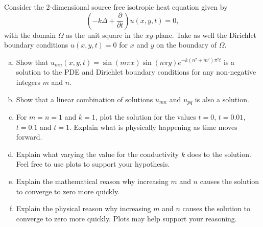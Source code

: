 \documentclass[12pt]{article} %
\begin{document}
\begin{problem}
    Consider the 2-dimensional source free isotropic heat equation given by
    \[
    \left( -k \Delta + \frac{\partial}{\partial t} \right) u(x,y,t) = 0,
    \]
    with the domain $\Omega$ as the unit square in the $xy$-plane. Take as well the Dirichlet boundary conditions $u(x,y,t)=0$ for $x$ and $y$ on the boundary of $\Omega$.
    \begin{enumerate}[(a)]
        \item Show that $u_{mn}(x,y,t)=\sin(m\pi x)\sin(n\pi y)e^{-k(n^2+m^2)\pi^2 t}$ is a solution to the PDE and Dirichlet boundary conditions for any non-negative integers $m$ and $n$.
        \item Show that a linear combination of solutions $u_{mn}$ and $u_{pq}$ is also a solution.
        \item For $m=n=1$ and $k=1$, plot the solution for the values $t=0$, $t=0.01$, $t=0.1$ and $t=1$.  Explain what is physically happening as time moves forward.
        \item Explain what varying the value for the conductivity $k$ does to the solution.  Feel free to use plots to support your hypothesis.
        \item Explain the mathematical reason why increasing $m$ and $n$ causes the solution to converge to zero more quickly.
        \item Explain the physical reason why increasing $m$ and $n$ causes the solution to converge to zero more quickly. Plots may help support your reasoning.
    \end{enumerate}
\end{problem}
\end{document}
